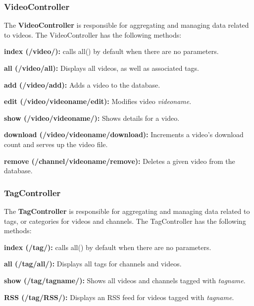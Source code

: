 \documentclass[a4paper,12pt]{report}
\begin{document}
\subsubsection{VideoController}
The \textbf{VideoController} is responsible for aggregating and managing data related to videos. The VideoController has the following methods:
\begin{description}
\item{\textbf{index (/video/): } calls all() by default when there are no parameters.}
\item{\textbf{all (/video/all): } Displays all videos, as well as associated tags.}
\item{\textbf{add (/video/add): } Adds a video to the database.}
\item{\textbf{edit (/video/videoname/edit): } Modifies video \textit{videoname}.}
\item{\textbf{show (/video/videoname/): } Shows details for a video.}
\item{\textbf{download (/video/videoname/download): } Increments a video's download count and serves up the video file.}
\item{\textbf{remove (/channel/videoname/remove): } Deletes a given video from the database.} \\
\end{description} 

\subsubsection{TagController}
The \textbf{TagController} is responsible for aggregating and managing data related to tags, or categories for videos and channels. The TagController has the following methods:
\begin{description}
\item{\textbf{index (/tag/): } calls all() by default when there are no parameters.}
\item{\textbf{all (/tag/all/): } Displays all tags for channels and videos.}
\item{\textbf{show (/tag/tagname/): } Shows all videos and channels tagged with \textit{tagname}.}
\item{\textbf{RSS (/tag/RSS/): } Displays an RSS feed for videos tagged with \textit{tagname}.} \\
\end{description} 
\end{document}
